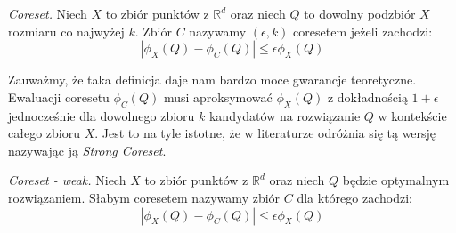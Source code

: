 \begin{definition}
    \emph{Coreset.} Niech $X$ to zbiór punktów z $\mathbb{R}^{d}$ oraz niech $Q$ to dowolny podzbiór $X$ rozmiaru co najwyżej $k$. 
    Zbiór $C$ nazywamy $(\epsilon, k)$ coresetem jeżeli zachodzi:
    \begin{equation}
        |\phi_{X}(Q) - \phi_{C}(Q)| \leq \epsilon\phi_{X}(Q)
    \end{equation}
\end{definition}

\noindent
Zauważmy, że taka definicja daje nam bardzo moce gwarancje teoretyczne.
Ewaluacji coresetu $\phi_{C}(Q)$ musi aproksymować $\phi_{X}(Q)$ z dokładnością $1+\epsilon$ jednocześnie dla dowolnego zbioru $k$ kandydatów na rozwiązanie $Q$ w kontekście całego zbioru $X$.
Jest to na tyle istotne, że w literaturze odróżnia się tą wersję nazywając ją \textit{Strong Coreset}.

\begin{definition}
    \emph{Coreset - weak.} Niech $X$ to zbiór punktów z $\mathbb{R}^{d}$ oraz niech $Q$ będzie optymalnym rozwiązaniem.
    Słabym coresetem nazywamy zbiór $C$ dla którego zachodzi:
    \begin{equation}
        |\phi_{X}(Q) - \phi_{C}(Q)| \leq \epsilon\phi_{X}(Q)
    \end{equation}
\end{definition}

